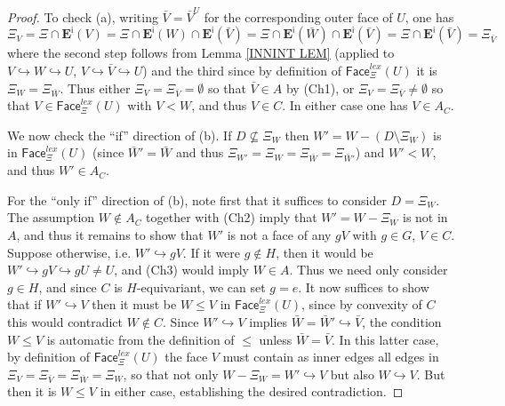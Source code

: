 \documentclass[a4paper,10pt
,draft
]{article}%
\begin{document}
\begin{proof}
To check (a), writing $\bar{V}=\bar{V}^U$ for the corresponding outer face of $U$, one has
	\[
	\Xi_V = \Xi \cap \boldsymbol{E}^{\mathsf{i}} (V) 
	= \Xi \cap \boldsymbol{E}^{\mathsf{i}}(W) \cap \boldsymbol{E}^{\mathsf{i}}(\bar{V})
	= \Xi \cap \boldsymbol{E}^{\mathsf{i}}(\bar{W}) \cap \boldsymbol{E}^{\mathsf{i}}(\bar{V})
	= \Xi \cap \boldsymbol{E}^{\mathsf{i}}(\bar{V})
	= \Xi_{\bar{V}}
	\]
where the second step follows from Lemma \ref{INNINT LEM}
(applied to $V \hookrightarrow W \hookrightarrow U$, 
$V \hookrightarrow \bar{V} \hookrightarrow U$)
and the third since by definition of
$\mathsf{Face}_{\Xi}^{lex}(U)$ it is $\Xi_{W} = \Xi_{\bar{W}}$.
Thus either $\Xi_V= \Xi_{\bar{V}} = \emptyset$ so that $\bar{V}\in A$ by (Ch1),
or $\Xi_V = \Xi_{\bar{V}} \neq \emptyset$
so that $V \in \mathsf{Face}_{\Xi}^{lex}(U)$ with $V<W$, and thus $V\in C$. In either case one has $V \in A_C$.

We now check the ``if'' direction of (b).
If $D \not \subseteq \Xi_{W}$
then $W' = W - (D \setminus \Xi_{W})$
is in $\mathsf{Face}_{\Xi}^{lex}(U)$
(since $\bar{W}' = \bar{W}$ and thus
$\Xi_{W'} = \Xi_{W}  = \Xi_{\bar{W}} = \Xi_{\bar{W}'}$)
and $W'<W$, and thus $W' \in A_C$.

For the ``only if'' direction of (b), 
note first that it suffices to consider $D = \Xi_W$.
The assumption $W \not \in A_C$ together with (Ch2) imply that
$W'=W-\Xi_{W}$ is not in $A$, and thus it remains to show that 
$W'$ is not a face of any $gV$ with $g\in G$, $V \in C$.
Suppose otherwise, i.e. $W' \hookrightarrow gV$.
If it were $g \not \in H$, 
then it would be $W' \hookrightarrow gV \hookrightarrow g U \neq U$, and (Ch3) would imply $W\in A$. Thus we need only consider $g\in H$, and since $C$ is $H$-equivariant, we can set $g=e$.
It now suffices to show that if $W' \hookrightarrow V$
then it must be $W \leq V$ in $\mathsf{Face}_{\Xi}^{lex}(U)$,
since by convexity of $C$ this would contradict $W \not \in C$.
Since $W' \hookrightarrow V$ implies 
$\bar{W} = \bar{W}' \hookrightarrow \bar{V}$,
the condition $W \leq V$ is automatic from the definition of $\leq$ unless $\bar{W} = \bar{V}$.
In this latter case, by definition of 
$\mathsf{Face}_{\Xi}^{lex}(U)$ the face $V$ must contain as inner edges all edges in 
$\Xi_V = \Xi_{\bar{V}} = \Xi_{\bar{W}} = \Xi_{W}$,
so that not only $W - \Xi_{W} = W' \hookrightarrow V$ but also $W \hookrightarrow V$. But then it is $W \leq V$ in either case, establishing the desired contradiction. 


\end{proof}
\end{document}
